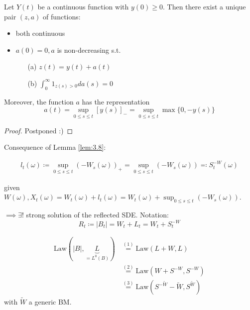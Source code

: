 
\begin{lemma}\label{lem:3.8}
    Let $Y(t)$ be a continuous function with $y(0)\geq 0$. Then there exist a unique 
    pair $(z,a)$ of functions:
    \begin{itemize}
        \item  both continuous
        \item $a(0)=0,a$ is non-decreasing s.t.\begin{enumerate}
            \item[(a)] $z(t)=y(t)+a(t)$
            \item[(b)] $\int_0^\infty 1_{z(s)>0}da(s)=0$ 
        \end{enumerate}
    \end{itemize}
    Moreover, the function $a$ has the representation
    \[a(t)=\sup_{0\leq s\leq t}[y(s)]_-=\sup_{0\leq s\leq t}\max\{0,-y(s)\}\]
\end{lemma}

\begin{proof}
    Postponed :)
\end{proof}

Consequence of Lemma \ref{lem:3.8}:

\begin{align*}
    l_t(\omega)\coloneqq \sup_{0\leq s\leq t}(-W_s(\omega))_+=\sup_{0\leq s\leq t}(-W_s(\omega))\eqqcolon S_t^{-W}(\omega)
\end{align*}

given $W(\omega), X_t(\omega)=W_t(\omega)+l_t(\omega)=W_t(\omega)+\sup_{0\leq s\leq t}(-W_s(\omega))$.

$\implies \exists!$ strong solution of the reflected SDE.
Notation: 
\[R_t\coloneqq |B_t|=W_t+L_t=W_t+S_t^{-W}\] 

\begin{theorem}\label{thm:3.9}
    \begin{align*}
        \text{Law}(|B|,\underbrace{L}_{=L^0(B)})&\stackrel{(1)}{=}\text{Law}(L+W,L)\\
        &\stackrel{(2)}{=}\text{Law}(W+S^{-W},S^{-W})\\
        &\stackrel{(3)}{=}\text{Law}(S^{-\tilde{W}}-\tilde{W},S^{\tilde{W}})
    \end{align*}
    with $\tilde{W}$ a generic BM.
\end{theorem}

